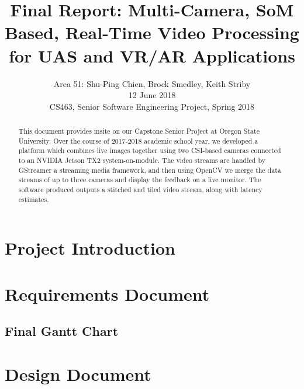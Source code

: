 \documentclass[letterpaper,10pt,serif,draftclsnofoot,onecolumn,compsoc,titlepage]{IEEEtran}
\title{Final Report: Multi-Camera, SoM Based, Real-Time Video Processing for UAS and VR/AR Applications}
\author{Area 51: Shu-Ping Chien, Brock Smedley, Keith Striby \\ 12 June 2018 \\ CS463, Senior Software Engineering Project, Spring 2018}
\begin{document}
\begin{titlepage}
\maketitle

\begin{abstract}

This document provides insite on our Capstone Senior Project at Oregon State University. 
Over the course of 2017-2018 academic school year, we developed a platform which combines 
live images together using two CSI-based cameras connected to an NVIDIA Jetson TX2 
system-on-module. The video streams are handled by GStreamer a streaming media 
framework, and then using OpenCV we merge the data streams of up to three cameras and 
display the feedback on a live monitor. The software produced outputs a stitched and 
tiled video stream, along with latency estimates. \\

\thispagestyle{empty}
\end{abstract}
\end{titlepage}

\newpage
\tableofcontents

\newpage

\section{Project Introduction}

	

\newpage

\section{Requirements Document}

	
\newpage

\subsection{Final Gantt Chart}

	

\newpage

\section{Design Document}

	
\end{document}
